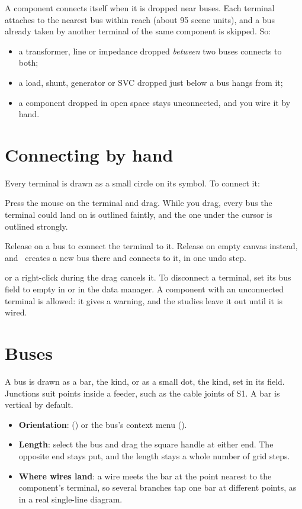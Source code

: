 A component connects itself when it is dropped near buses. Each terminal attaches to the
nearest bus within reach (about 95 scene units), and a bus already taken by another
terminal of the same component is skipped. So:

\begin{itemize}
  \item a transformer, line or impedance dropped \emph{between} two buses connects to both;
  \item a load, shunt, generator or SVC dropped just below a bus hangs from it;
  \item a component dropped in open space stays unconnected, and you wire it by hand.
\end{itemize}

\section{Connecting by hand}\label{sec:connecting}

Every terminal is drawn as a small circle on its symbol. To connect it:

\begin{steps}
  \item Press the mouse on the terminal and drag. While you drag, every bus the terminal
    could land on is outlined faintly, and the one under the cursor is outlined strongly.
  \item Release on a bus to connect the terminal to it. Release on empty canvas instead,
    and \app\ creates a new bus there and connects to it, in one undo step.
\end{steps}

 or a right-click during the drag cancels it. To disconnect a terminal, set its
bus field to empty in  or in the data manager. A component with an
unconnected terminal is allowed: it gives a warning, and the studies leave it out until
it is wired.

\section{Buses}

A bus is drawn as a bar, the  kind, or as a small dot, the 
kind, set in its  field. Junctions suit points inside a feeder, such as the
cable joints of S1. A bar is vertical by default.

\begin{itemize}
  \item \textbf{Orientation}:  ()
    or the bus's context menu ().
  \item \textbf{Length}: select the bus and drag the square handle at either end. The
    opposite end stays put, and the length stays a whole number of grid steps.
  \item \textbf{Where wires land}: a wire meets the bar at the point nearest to the
    component's terminal, so several branches tap one bar at different points, as in a
    real single-line diagram.
\end{itemize}

